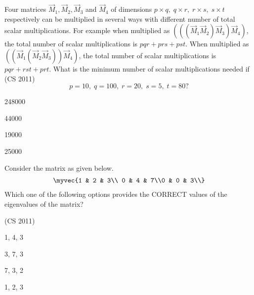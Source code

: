 \item Four matrices $\vec{M}_1, \vec{M}_2, \vec{M}_3$ and $\vec{M}_4$ of dimensions $p \times q, \; q \times r, \; r \times s, \; s \times t$ respectively can be multiplied in several ways with different number of total scalar multiplications. For example when multiplied as $(((\vec{M}_1 \vec{M}_2) \vec{M}_3) \vec{M}_4)$, the total number of scalar multiplications is $pqr + prs + pst$. When multiplied as $((\vec{M}_1 (\vec{M}_2 \vec{M}_3)) \vec{M}_4)$, the total number of scalar multiplications is $pqr + rst + prt$. What is the minimum number of scalar multiplications needed if
\hfill {(CS 2011)}
\[
p = 10, \; q = 100, \; r = 20, \; s = 5, \; t = 80 ?
\]
\begin{enumerate}
\begin{multicols}{4}
    \item 248000
    \item 44000
    \item 19000
    \item 25000
    \end{multicols}
\end{enumerate}
\item  Consider the matrix as given below.
\begin{align*}
    \myvec{1 & 2 & 3\\ 0 & 4 & 7\\0 & 0 & 3\\}
\end{align*}
Which one of the following options provides the {CORRECT} values of the eigenvalues of the matrix? 

\hfill {(CS 2011)} 
\begin{enumerate}
\begin{multicols}{4}
\item 1, 4, 3
\item 3, 7, 3
\item 7, 3, 2
\item 1, 2, 3
\end{multicols}
\end{enumerate}

